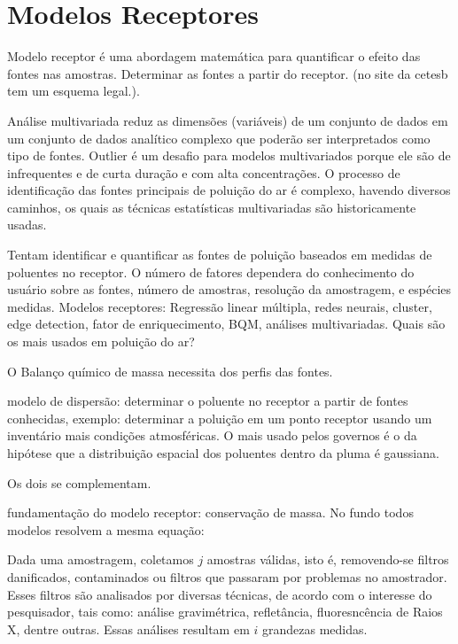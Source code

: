 \section{Modelos Receptores}

Modelo receptor é uma abordagem matemática para quantificar o efeito das fontes 
nas amostras. Determinar as fontes a partir do receptor. 
(no site da cetesb tem um esquema legal.).

Análise multivariada reduz as dimensões (variáveis) de um conjunto de dados 
em um conjunto de dados analítico complexo que poderão ser interpretados como 
tipo de fontes.
Outlier é um desafio para modelos multivariados porque ele são de infrequentes 
e de curta duração e com alta concentrações.
O processo de identificação das fontes principais de poluição do ar é complexo,
havendo diversos caminhos, os quais as técnicas estatísticas multivariadas 
são historicamente usadas.

Tentam identificar e quantificar as fontes de poluição baseados em medidas de 
poluentes no receptor. 
O número de fatores dependera do conhecimento do usuário sobre as fontes, 
número de amostras, resolução da amostragem, e espécies medidas.
Modelos receptores: Regressão linear múltipla, redes neurais, cluster, 
edge detection, fator de enriquecimento, BQM, análises multivariadas. 
Quais são os mais usados em poluição do ar?

O Balanço químico de massa necessita dos perfis das fontes.

modelo de dispersão: determinar o poluente no receptor a partir de fontes 
conhecidas, exemplo: determinar a poluição em um ponto receptor usando um 
inventário mais condições atmosféricas. O mais usado pelos governos é o da 
hipótese que a distribuição espacial dos poluentes dentro da pluma é gaussiana.  

Os dois se complementam.

fundamentação do modelo receptor: conservação de massa. No fundo todos modelos resolvem a mesma equação: 

Dada uma amostragem, coletamos $j$ amostras válidas, isto é, removendo-se filtros danificados, contaminados ou filtros que passaram por problemas no amostrador. Esses filtros são analisados por diversas técnicas, de acordo com o interesse do pesquisador, tais como: análise gravimétrica, refletância, fluoresncência de Raios X, dentre outras. Essas análises resultam em $i$ grandezas medidas.

